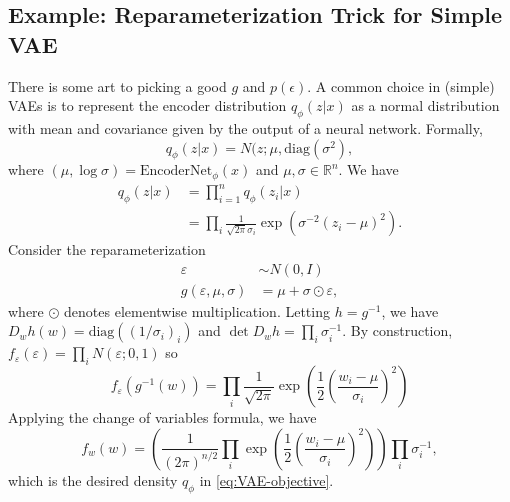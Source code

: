 \documentclass{article}
\newcommand{\R}{\mathbb{R}}
\newcommand{\diag}{\text{diag}}
\newcommand{\eps}{\varepsilon}
\begin{document}
\subsection{Example: Reparameterization Trick for Simple VAE}
There is some art to picking a good $g$ and $p(\epsilon)$. A common choice in (simple) VAEs is to represent the encoder distribution $q_\phi(z|x)$ as a normal distribution with mean and covariance given by the output of a neural network. Formally, 
$$
q_\phi(z|x) = N(z; \mu, \diag(\sigma^2),
$$
where $(\mu, \log \sigma) = \mbox{EncoderNet}_\phi(x)$ and $\mu, \sigma \in \R^n$. 
We have
\begin{align}
q_\phi(z|x) & = \prod_{i=1}^n q_\phi(z_i|x)\\
& = \prod_{i} \frac{1}{\sqrt{2\pi}\sigma_i} \exp(\sigma^{-2}(z_i - \mu)^2).
\label{eq:reparam2}
\end{align}
Consider the reparameterization 
\begin{align}
    \eps & \sim  N(0, I)\\
    g(\eps, \mu, \sigma) & = \mu + \sigma \odot \eps,
\end{align}
where $\odot$ denotes elementwise multiplication. 
Letting $h = g^{-1}$, we have $D_w h(w) = \diag((1/\sigma_i)_i)$ and $\det D_w h = \prod_i \sigma_i^{-1}$. By construction, $f_\eps(\eps) = \prod_{i} N(\eps; 0, 1)$ so
$$
f_\eps(g^{-1}(w)) = \prod_i \frac{1}{\sqrt{2\pi}}\exp{\left(\frac{1}{2}\left(\frac{w_i - \mu}{\sigma_i}\right)^2\right)}
$$
Applying the change of variables formula, we have
$$
f_w(w) = \left(\frac{1}{(2\pi)^{n/2}} \prod_i \exp(\frac{1}{2}\left(\frac{w_i - \mu}{\sigma_i}\right)^2)\right)\prod_i \sigma_i^{-1},
$$
which is the desired density $q_\phi$ in \eqref{eq:VAE-objective}. 
\end{document}
